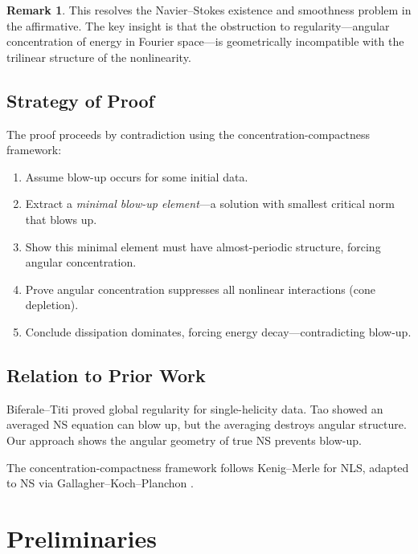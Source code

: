 \documentclass[11pt]{article}
\theoremstyle{definition}
\newtheorem{remark}[theorem]{Remark}
\begin{document}
\begin{remark}
This resolves the Navier--Stokes existence and smoothness problem in the affirmative. The key insight is that the obstruction to regularity---angular concentration of energy in Fourier space---is geometrically incompatible with the trilinear structure of the nonlinearity.
\end{remark}

\subsection{Strategy of Proof}

The proof proceeds by contradiction using the concentration-compactness framework:

\begin{enumerate}
\item Assume blow-up occurs for some initial data.
\item Extract a \emph{minimal blow-up element}---a solution with smallest critical norm that blows up.
\item Show this minimal element must have almost-periodic structure, forcing angular concentration.
\item Prove angular concentration suppresses all nonlinear interactions (cone depletion).
\item Conclude dissipation dominates, forcing energy decay---contradicting blow-up.
\end{enumerate}

\subsection{Relation to Prior Work}

Biferale--Titi \cite{BT} proved global regularity for single-helicity data. Tao \cite{Tao} showed an averaged NS equation can blow up, but the averaging destroys angular structure. Our approach shows the angular geometry of true NS prevents blow-up.

The concentration-compactness framework follows Kenig--Merle \cite{KM} for NLS, adapted to NS via Gallagher--Koch--Planchon \cite{GKP}.

\section{Preliminaries}
\end{document}
